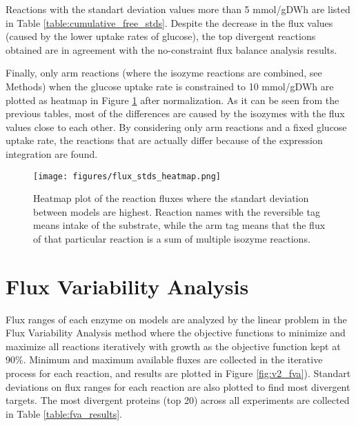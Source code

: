 Reactions with the standart deviation values more than 5 mmol/gDWh are listed in Table \ref{table:cumulative_free_stds}. Despite the decrease in the flux values (caused by the lower uptake rates of glucose), the top divergent reactions obtained are in agreement with the no-constraint flux balance analysis results.



Finally, only arm reactions (where the isozyme reactions are combined, see Methods) when the glucose uptake rate is constrained to 10 mmol/gDWh are plotted as heatmap in Figure \ref{fig:flux_stds_heatmap} after normalization. As it can be seen from the previous tables, most of the differences are caused by the isozymes with the flux values close to each other. By considering only arm reactions and a fixed glucose uptake rate, the reactions that are actually differ because of the expression integration are found.



\begin{figure}[H]
\begin{center}
\texttt{[image: figures/flux\_stds\_heatmap.png]}
\caption[Heatmap plot of the reaction fluxes where the standart deviation between models are highest. Reaction names with the reversible tag means intake of the substrate, while the arm tag means that the flux of that particular reaction is a sum of multiple isozyme reactions]{Heatmap plot of the reaction fluxes where the standart deviation between models are highest. Reaction names with the reversible tag means intake of the substrate, while the arm tag means that the flux of that particular reaction is a sum of multiple isozyme reactions. }
\end{center}
\label{fig:flux_stds_heatmap}
\end{figure}


\section{Flux Variability Analysis}
Flux ranges of each enzyme on models are analyzed by the linear problem in the Flux Variability Analysis method where the objective functions to minimize and maximize all reactions iteratively with growth as the objective function kept at 90\%. Minimum and maximum available fluxes are collected in the iterative process for each reaction, and results are plotted in Figure \ref{fig:v2_fva}). Standart deviations on flux ranges for each reaction are also plotted to find most divergent targets. The most divergent proteins (top 20) across all experiments are collected in Table \ref{table:fva_results}.

